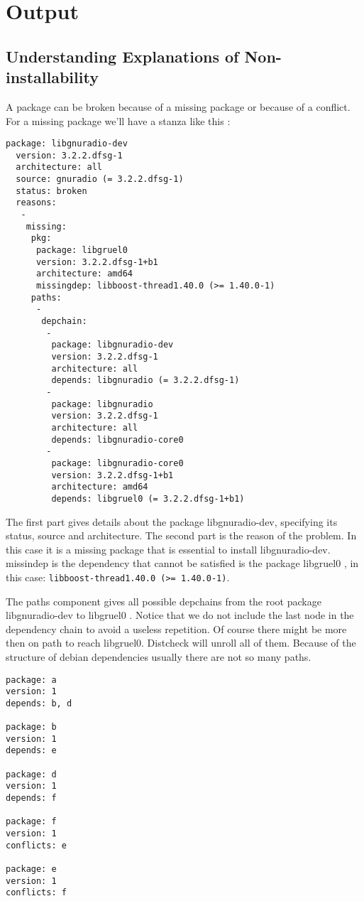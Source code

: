 \section{Output}
\label{sec:output}

\subsection{Understanding Explanations of Non-installability}

A package can be broken because of a missing package or because of a
conflict. For a missing package we'll have a stanza like this :

\begin{verbatim}
package: libgnuradio-dev
  version: 3.2.2.dfsg-1
  architecture: all
  source: gnuradio (= 3.2.2.dfsg-1)
  status: broken
  reasons:
   -
    missing:
     pkg:
      package: libgruel0
      version: 3.2.2.dfsg-1+b1
      architecture: amd64
      missingdep: libboost-thread1.40.0 (>= 1.40.0-1)
     paths:
      -
       depchain:
        -
         package: libgnuradio-dev
         version: 3.2.2.dfsg-1
         architecture: all
         depends: libgnuradio (= 3.2.2.dfsg-1)
        -
         package: libgnuradio
         version: 3.2.2.dfsg-1
         architecture: all
         depends: libgnuradio-core0
        -
         package: libgnuradio-core0
         version: 3.2.2.dfsg-1+b1
         architecture: amd64
         depends: libgruel0 (= 3.2.2.dfsg-1+b1)
\end{verbatim}

The first part gives details about the package libgnuradio-dev, specifying its
status, source and architecture. The second part is the reason of the problem.
In this case it is a missing package that is essential to install
libgnuradio-dev. missindep is the dependency that cannot be satisfied is the
package libgruel0 , in this case: {\tt libboost-thread1.40.0 (>= 1.40.0-1)}.

The paths component gives all possible depchains from the root package
libgnuradio-dev to libgruel0 . Notice that we do not include the last node in
the dependency chain to avoid a useless repetition. Of course there might be
more then on path to reach libgruel0. Distcheck will unroll all of them.
Because of the structure of debian dependencies usually there are not so many
paths.

\begin{verbatim}
package: a
version: 1
depends: b, d

package: b
version: 1
depends: e

package: d
version: 1
depends: f

package: f
version: 1
conflicts: e

package: e
version: 1
conflicts: f
\end{verbatim}

